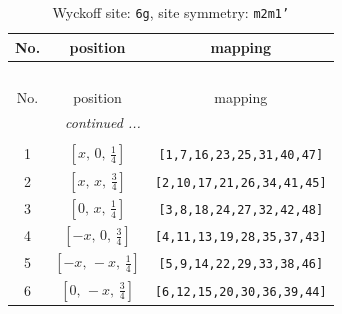 \documentclass[fleqn,8pt]{jsarticle}
\begin{document}
\renewcommand{\arraystretch}{1.2}
\begin{longtable}{ccc}
\caption{Wyckoff site: {\tt 6g}, site symmetry: {\tt m2m1'}}
 \\
 \hline \hline
No. & position & mapping \\ \hline \endfirsthead

\multicolumn{2}{l}{\tablename\ \thetable{}} \\
 \hline \hline
No. & position & mapping \\ \hline \endhead

 \hline \hline
\multicolumn{2}{r}{\footnotesize\it continued ...} \\ \endfoot

 \hline \hline
\multicolumn{2}{r}{} \\ \endlastfoot

1 & $\left[ x,\, 0,\, \frac{1}{4} \right]$ & {\tt [1,7,16,23,25,31,40,47]} \\ \hline
2 & $\left[ x,\, x,\, \frac{3}{4} \right]$ & {\tt [2,10,17,21,26,34,41,45]} \\ \hline
3 & $\left[ 0,\, x,\, \frac{1}{4} \right]$ & {\tt [3,8,18,24,27,32,42,48]} \\ \hline
4 & $\left[ - x,\, 0,\, \frac{3}{4} \right]$ & {\tt [4,11,13,19,28,35,37,43]} \\ \hline
5 & $\left[ - x,\, - x,\, \frac{1}{4} \right]$ & {\tt [5,9,14,22,29,33,38,46]} \\ \hline
6 & $\left[ 0,\, - x,\, \frac{3}{4} \right]$ & {\tt [6,12,15,20,30,36,39,44]} \\
\end{longtable}
\renewcommand{\arraystretch}{1.2}
\end{document}
